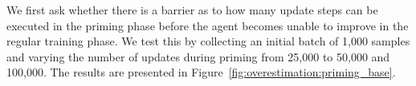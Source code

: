 
\label{sec:overestimation}
We first ask whether there is a barrier as to how many update steps can be executed in the priming phase before the agent becomes unable to improve in the regular training phase.
We test this by collecting an initial batch of 1,000 samples and varying the number of updates during priming from 25,000 to 50,000 and 100,000. The results are presented in Figure~\ref{fig:overestimation:priming_base}. 


